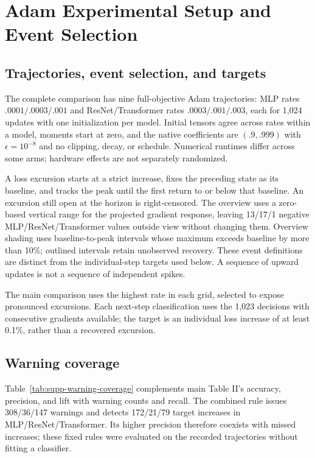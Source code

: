 \clearpage
\section{Adam Experimental Setup and Event Selection}

\subsection{Trajectories, event selection, and targets}
The complete comparison has nine full-objective Adam trajectories: MLP rates $.0001/.0003/.001$ and ResNet/Transformer rates $.0003/.001/.003$, each for 1,024 updates with one initialization per model. Initial tensors agree across rates within a model, moments start at zero, and the native coefficients are $(.9,.999)$ with $\epsilon=10^{-8}$ and no clipping, decay, or schedule. Numerical runtimes differ across some arms; hardware effects are not separately randomized.

A loss excursion starts at a strict increase, fixes the preceding state as its baseline, and tracks the peak until the first return to or below that baseline. An excursion still open at the horizon is right-censored. The overview uses a zero-based vertical range for the projected gradient response, leaving 13/17/1 negative MLP/ResNet/Transformer values outside view without changing them. Overview shading uses baseline-to-peak intervals whose maximum exceeds baseline by more than 10\%; outlined intervals retain unobserved recovery. These event definitions are distinct from the individual-step targets used below. A sequence of upward updates is not a sequence of independent spikes.

The main comparison uses the highest rate in each grid, selected to expose pronounced excursions. Each next-step classification uses the 1,023 decisions with consecutive gradients available; the target is an individual loss increase of at least 0.1\%, rather than a recovered excursion.

\subsection{Warning coverage}
Table~\ref{tab:supp-warning-coverage} complements main Table II's accuracy, precision, and lift with warning counts and recall. The combined rule issues 308/36/147 warnings and detects 172/21/79 target increases in MLP/ResNet/Transformer. Its higher precision therefore coexists with missed increases; these fixed rules were evaluated on the recorded trajectories without fitting a classifier.


